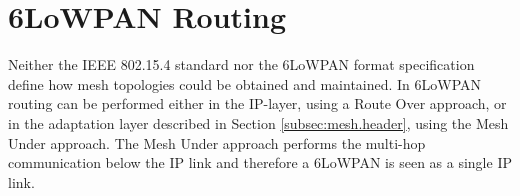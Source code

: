 \chapter{6LoWPAN Routing}\label{ch:routing}
Neither the IEEE 802.15.4 \cite{ieee802.15.4} standard nor the 6LoWPAN format specification \cite{rfc4944} define how mesh topologies could be obtained and maintained. In 6LoWPAN routing can be performed either in the IP-layer, using a Route Over approach, or in the adaptation layer described in Section \ref{subsec:mesh.header}, using the Mesh Under approach. The Mesh Under approach performs the multi-hop communication below the IP link and therefore a 6LoWPAN is seen as a single IP link. 


